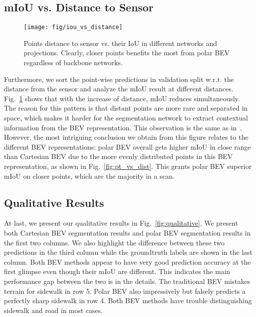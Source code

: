 \documentclass[10pt,twocolumn,letterpaper]{article}
\begin{document}
\subsection{mIoU vs. Distance to Sensor}

\begin{figure}
  \centering
  \texttt{[image: fig/iou\_vs\_distance]}
  \vspace{-4pt}
  \caption{Points distance to sensor vs. their IoU in different networks and projections. Clearly, closer points benefits the most from polar BEV regardless of backbone networks.}
  \label{fig:iou_vs_dist}
  \vspace{-15pt}
\end{figure}

Furthermore, we sort the point-wise predictions in validation split w.r.t. the distance from the sensor and analyze the mIoU result at different distances. Fig.~\ref{fig:iou_vs_dist} shows that with the increase of distance, mIoU reduces simultaneously. The reason for this pattern is that distant points are more rare and separated in space, which makes it harder for the segmentation network to extract contextual information from the BEV representation. This observation is the same as in~\cite{behley2019iccv}. However, the most intriguing conclusion we obtain from this figure relates to the different BEV representations: polar BEV overall gets higher mIoU in close range than Cartesian BEV due to the more evenly distributed points in this BEV representation, as shown in Fig.~\ref{fig:pt_vs_dist}. This grants polar BEV superior mIoU on closer points, which are the majority in a scan.



\iffalse

\subsection{Qualitative Results}

At last, we present our qualitative results in Fig.~\ref{fig:qualitative}. We present both Cartesian BEV segmentation results and polar BEV segmentation results in the first two columns. We also highlight the difference between these two predictions in the third column while the groundtruth labels are shown in the last column. Both BEV methods appear to have very good prediction accuracy at the first glimpse even though their mIoU are different. This indicates the main performance gap between the two is in the details.  The traditional BEV mistakes terrain for sidewalk in row 5. Polar BEV also impressively but falsely predicts a perfectly sharp sidewalk in row 4. Both BEV methods have trouble distinguishing sidewalk and road in most cases.
\end{document}
